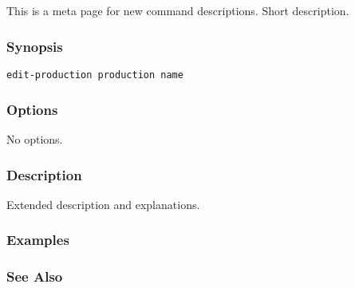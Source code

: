 \subsection{}
\label{edit-production}
 This is a meta page for new command descriptions. 
Short description. 
\subsubsection*{Synopsis}
\begin{verbatim}
edit-production production name
\end{verbatim}
\subsubsection*{Options}
 No options. 
\subsubsection*{Description}
 Extended description and explanations. 
\subsubsection*{Examples}
\subsubsection*{See Also}

